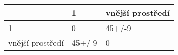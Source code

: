 \begin{tabular}{lll}
\toprule
{} &       1 & vnější prostředí \\
\midrule
1                &       0 &           45+/-9 \\
vnější prostředí &  45+/-9 &                0 \\
\bottomrule
\end{tabular}
